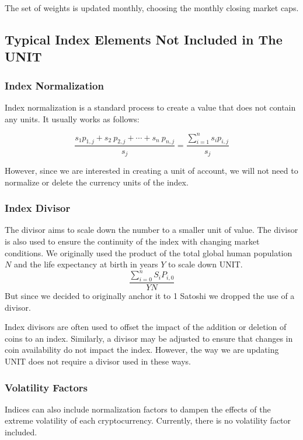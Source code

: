 \documentclass[12pt]{article}
\begin{document}
The set of weights is updated monthly, choosing the monthly closing market caps.

\subsection{Typical Index Elements Not Included in The UNIT}

\subsubsection{Index Normalization}

Index normalization is a standard process to create a value that does not contain any units. It usually works as follows:

$$
\frac{s_1 p_{1,j}+ s_2\ p_{2,j}+\cdots+ s_n\ p_{n,j}}{s_j}= \frac{\displaystyle{\sum_{i=1}^{n} s_ip_{i,j}}}{s_j}
$$

However, since we are interested in creating a unit of account, we will not need to normalize or delete the currency units of the index. 


\subsubsection{Index Divisor}

The divisor aims to scale down the number to a smaller unit of value. The divisor is also used to ensure the continuity of the index with changing market conditions. We originally used the product of the total global human population $N$ and the life expectancy at birth in years $Y$ to scale down UNIT. 
$$
\frac{\displaystyle{\sum_{i=0}^{n} S_iP_{i,0}}}{Y N}
$$
But since we decided to originally anchor it to 1 Satoshi we dropped the use of a divisor.

Index divisors are often used to offset the impact of the addition or deletion of coins to an index. Similarly, a divisor may be adjusted to ensure that changes in coin availability do not impact the index. However, the way we are updating UNIT does not require a divisor used in these ways. 


\subsubsection{Volatility Factors}

Indices can also include normalization factors to dampen the effects of the extreme volatility of each cryptocurrency. Currently, there is no volatility factor included.
\end{document}

